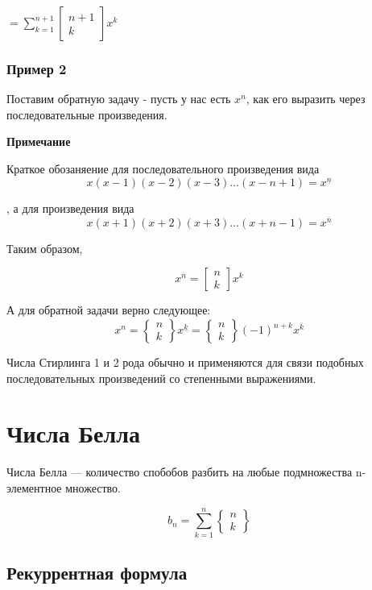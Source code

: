 $= \sum\limits_{k=1}^{n+1} 
\begin{bmatrix} n+1 \\ k \end{bmatrix} x^{k} 
$

\subsubsection{Пример 2}

Поставим обратную задачу - пусть у нас есть $ x^{n} $, как его выразить через последовательные произведения.

\textbf{Примечание}

Краткое обозаняение для последовательного произведения вида
$$
x(x-1)(x-2)(x-3)\ldots(x-n+1) = x^{\underline{n}}
$$

, а для произведения вида
$$
x(x+1)(x+2)(x+3)\ldots(x+n-1) = x^{\overline{n}}
$$

Таким образом, 

$$
x^{\overline{n}} = \begin{bmatrix} n \\ k \end{bmatrix} x^{k} 
$$

А для обратной задачи верно следующее:
$$
x^{n} = \begin{Bmatrix} n \\ k \end{Bmatrix} x^{\underline{k}} 
= \begin{Bmatrix} n \\ k \end{Bmatrix} (-1)^{n+k} x^{\overline{k}} 
$$

Числа Стирлинга 1 и 2 рода обычно и применяются для связи 
подобных последовательных произведений со степенными выражениями.

\section{Числа Белла}

Числа Белла --- количество спобобов разбить на любые подмножества n-элементное множество.

$$
b_{n} = \sum\limits_{k=1}^{n} \begin{Bmatrix} n \\ k \end{Bmatrix}
$$

\subsection{Рекуррентная формула}

